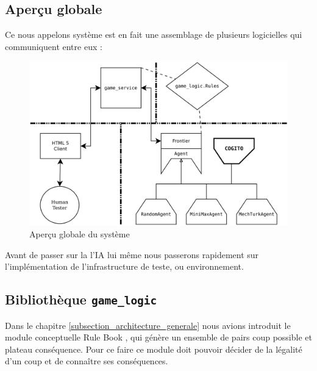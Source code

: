 \subsection{Aperçu globale}

Ce nous appelons système est en fait une assemblage de plusieurs logicielles qui communiquent entre eux :

\begin{figure}[H] 
\centering
\includegraphics[width=\textwidth]{files/william/archi_full} 
\caption{Aperçu globale du système} 
\end{figure}

Avant de passer sur la l'IA lui même nous passerons rapidement sur l'implémentation de l'infrastructure de teste, ou environnement.

\subsection{Bibliothèque \texttt{\gls{game_logic}}}

Dans le chapitre \ref{subsection_architecture_generale} nous avions introduit le module conceptuelle \og Rule Book \fg{}, qui génère un ensemble de pairs coup possible et plateau conséquence. Pour ce faire ce module doit pouvoir décider de la légalité d'un coup et de connaître ses conséquences. 

